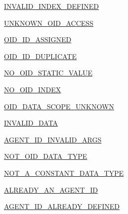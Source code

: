 \begin{DoxyCompactItemize}
\item 
\hyperlink{enummib2bib_1_1mib2bib_1_1_f_i_l_e___e_r_r_o_r___c_o_d_e_a30a93a87077b9f3733666d75cc298f15}{I\+N\+V\+A\+L\+I\+D\+\_\+\+I\+N\+D\+E\+X\+\_\+\+D\+E\+F\+I\+N\+E\+D}
\item 
\hyperlink{enummib2bib_1_1mib2bib_1_1_f_i_l_e___e_r_r_o_r___c_o_d_e_ade887454beabb5337f4c887103b06619}{U\+N\+K\+N\+O\+W\+N\+\_\+\+O\+I\+D\+\_\+\+A\+C\+C\+E\+S\+S}
\item 
\hyperlink{enummib2bib_1_1mib2bib_1_1_f_i_l_e___e_r_r_o_r___c_o_d_e_ad92318f43da11a4b3fe8dfd866a3707c}{O\+I\+D\+\_\+\+I\+D\+\_\+\+A\+S\+S\+I\+G\+N\+E\+D}
\item 
\hyperlink{enummib2bib_1_1mib2bib_1_1_f_i_l_e___e_r_r_o_r___c_o_d_e_a99fd53b6d5fde7a98856550b765b5cc0}{O\+I\+D\+\_\+\+I\+D\+\_\+\+D\+U\+P\+L\+I\+C\+A\+T\+E}
\item 
\hyperlink{enummib2bib_1_1mib2bib_1_1_f_i_l_e___e_r_r_o_r___c_o_d_e_a1d918e744c8a7842a834efea62a1cc91}{N\+O\+\_\+\+O\+I\+D\+\_\+\+S\+T\+A\+T\+I\+C\+\_\+\+V\+A\+L\+U\+E}
\item 
\hyperlink{enummib2bib_1_1mib2bib_1_1_f_i_l_e___e_r_r_o_r___c_o_d_e_a4387a90e5a02ba2ca801c70b055da9aa}{N\+O\+\_\+\+O\+I\+D\+\_\+\+I\+N\+D\+E\+X}
\item 
\hyperlink{enummib2bib_1_1mib2bib_1_1_f_i_l_e___e_r_r_o_r___c_o_d_e_a8ac26c968c37690841dafd28d77bd717}{O\+I\+D\+\_\+\+D\+A\+T\+A\+\_\+\+S\+C\+O\+P\+E\+\_\+\+U\+N\+K\+N\+O\+W\+N}
\item 
\hyperlink{enummib2bib_1_1mib2bib_1_1_f_i_l_e___e_r_r_o_r___c_o_d_e_abb2717a64bca44c93966a6c70cd663a3}{I\+N\+V\+A\+L\+I\+D\+\_\+\+D\+A\+T\+A}
\item 
\hyperlink{enummib2bib_1_1mib2bib_1_1_f_i_l_e___e_r_r_o_r___c_o_d_e_af688c115fa6b8e2ff2f82cb6718cd639}{A\+G\+E\+N\+T\+\_\+\+I\+D\+\_\+\+I\+N\+V\+A\+L\+I\+D\+\_\+\+A\+R\+G\+S}
\item 
\hyperlink{enummib2bib_1_1mib2bib_1_1_f_i_l_e___e_r_r_o_r___c_o_d_e_a14a98295a96c4005c3d5b68a58d19b70}{N\+O\+T\+\_\+\+O\+I\+D\+\_\+\+D\+A\+T\+A\+\_\+\+T\+Y\+P\+E}
\item 
\hyperlink{enummib2bib_1_1mib2bib_1_1_f_i_l_e___e_r_r_o_r___c_o_d_e_a4e9e8d96bce5c6f42affd30f0823b184}{N\+O\+T\+\_\+\+A\+\_\+\+C\+O\+N\+S\+T\+A\+N\+T\+\_\+\+D\+A\+T\+A\+\_\+\+T\+Y\+P\+E}
\item 
\hyperlink{enummib2bib_1_1mib2bib_1_1_f_i_l_e___e_r_r_o_r___c_o_d_e_a00414ebb83f3021bb4f560e0218f67ff}{A\+L\+R\+E\+A\+D\+Y\+\_\+\+A\+N\+\_\+\+A\+G\+E\+N\+T\+\_\+\+I\+D}
\item 
\hyperlink{enummib2bib_1_1mib2bib_1_1_f_i_l_e___e_r_r_o_r___c_o_d_e_a71f3e985aa8686d7429a2ce4edc921f0}{A\+G\+E\+N\+T\+\_\+\+I\+D\+\_\+\+A\+L\+R\+E\+A\+D\+Y\+\_\+\+D\+E\+F\+I\+N\+E\+D}

\end{DoxyCompactItemize}
